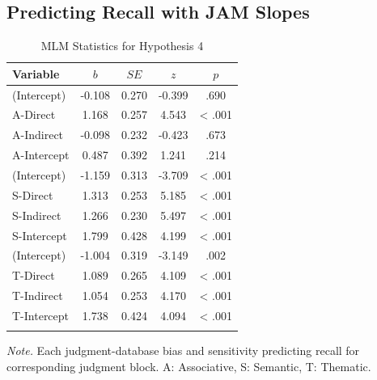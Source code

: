 \documentclass[english,,man]{apa6}
\begin{document}
\hypertarget{predicting-recall-with-jam-slopes}{%
\subsection{Predicting Recall with JAM Slopes}\label{predicting-recall-with-jam-slopes}}

\begin{table}[tbp]
\begin{center}
\begin{threeparttable}
\caption{\label{tab:hyp4-table}MLM Statistics for Hypothesis 4}
\begin{tabular}{lcccc}
\toprule
Variable & \multicolumn{1}{c}{$b$} & \multicolumn{1}{c}{$SE$} & \multicolumn{1}{c}{$z$} & \multicolumn{1}{c}{$p$}\\
\midrule
(Intercept) & -0.108 & 0.270 & -0.399 & .690\\
A-Direct & 1.168 & 0.257 & 4.543 & < .001\\
A-Indirect & -0.098 & 0.232 & -0.423 & .673\\
A-Intercept & 0.487 & 0.392 & 1.241 & .214\\
(Intercept) & -1.159 & 0.313 & -3.709 & < .001\\
S-Direct & 1.313 & 0.253 & 5.185 & < .001\\
S-Indirect & 1.266 & 0.230 & 5.497 & < .001\\
S-Intercept & 1.799 & 0.428 & 4.199 & < .001\\
(Intercept) & -1.004 & 0.319 & -3.149 & .002\\
T-Direct & 1.089 & 0.265 & 4.109 & < .001\\
T-Indirect & 1.054 & 0.253 & 4.170 & < .001\\
T-Intercept & 1.738 & 0.424 & 4.094 & < .001\\
\bottomrule
\addlinespace
\end{tabular}
\begin{tablenotes}[para]
\normalsize{\textit{Note.} Each judgment-database bias and sensitivity predicting recall for corresponding judgment block. A: Associative, S: Semantic, T: Thematic.}
\end{tablenotes}
\end{threeparttable}
\end{center}
\end{table}
\end{document}
